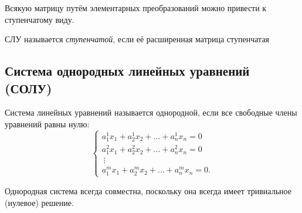 \begin{theorem}
    Всякую матрицу путём элементарных преобразований можно привести к ступенчатому виду.
\end{theorem}
\begin{definition}
    СЛУ называется \textit{ступенчатой}, если её расширенная матрица ступенчатая
\end{definition}

\subsection*{Система однородных линейных уравнений (СОЛУ)}
\begin{definition}
    Система линейных уравнений называется однородной, если все свободные члены уравнений равны нулю:
    \begin{equation}
        \label{eq:SOLU}
        \begin{cases}
            a_1^1x_1 +  a_2^1x_2 + \ldots + a_n^1x_n = 0 \\
            a_1^2x_1 +  a_2^2x_2 + \ldots + a_n^2x_n = 0 \\
            ~\vdots \\
            a_1^mx_1 +  a_2^mx_2 + \dots + a_n^mx_n = 0.
        \end{cases}
        \end{equation}
\end{definition}
Однородная система всегда совместна, поскольку она всегда имеет тривиальное (нулевое) решение.

